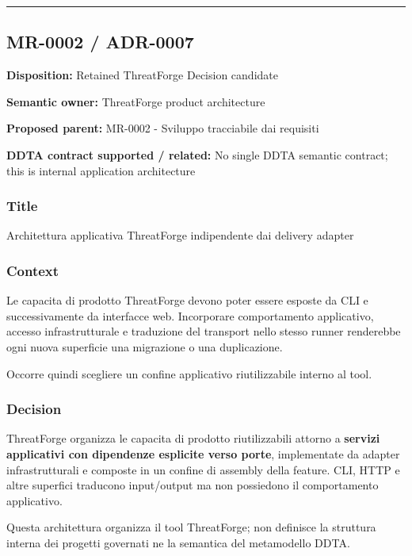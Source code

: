 \documentclass[
  10pt,
  a4paper,
]{article}
\begin{document}
\begin{center}\rule{0.5\linewidth}{0.5pt}\end{center}

\subsection{MR-0002 / ADR-0007}\label{mr-0002-adr-0007}

\textbf{Disposition:} Retained ThreatForge Decision candidate

\textbf{Semantic owner:} ThreatForge product architecture

\textbf{Proposed parent:} MR-0002 - Sviluppo tracciabile dai requisiti

\textbf{DDTA contract supported / related:} No single DDTA semantic
contract; this is internal application architecture

\subsubsection{Title}\label{title-14}

Architettura applicativa ThreatForge indipendente dai delivery adapter

\subsubsection{Context}\label{context-14}

Le capacita di prodotto ThreatForge devono poter essere esposte da CLI e
successivamente da interfacce web. Incorporare comportamento
applicativo, accesso infrastrutturale e traduzione del transport nello
stesso runner renderebbe ogni nuova superficie una migrazione o una
duplicazione.

Occorre quindi scegliere un confine applicativo riutilizzabile interno
al tool.

\subsubsection{Decision}\label{decision-14}

ThreatForge organizza le capacita di prodotto riutilizzabili attorno a
\textbf{servizi applicativi con dipendenze esplicite verso porte},
implementate da adapter infrastrutturali e composte in un confine di
assembly della feature. CLI, HTTP e altre superfici traducono
input/output ma non possiedono il comportamento applicativo.

Questa architettura organizza il tool ThreatForge; non definisce la
struttura interna dei progetti governati ne la semantica del metamodello
DDTA.
\end{document}
